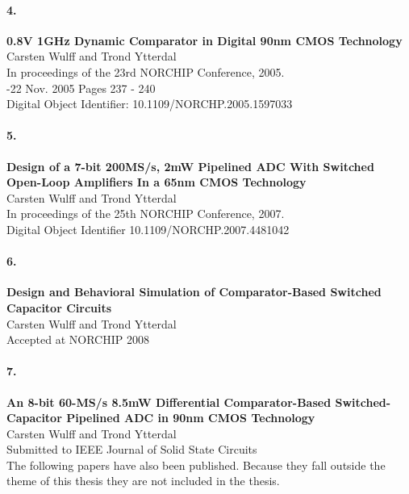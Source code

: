 \newpage
\paragraph{4.}\textbf{ 0.8V 1GHz Dynamic Comparator in Digital 90nm CMOS
  Technology}
\newline
\indent   Carsten Wulff and Trond Ytterdal\\
\indent In proceedings of the 23rd NORCHIP Conference, 2005. \\
-22 Nov. 2005 Pages 237 - 240 \\
\indent Digital Object Identifier: 10.1109/NORCHP.2005.1597033\\

\paragraph{5.}\textbf{Design of a 7-bit 200MS/s, 2mW Pipelined ADC With Switched
  Open-Loop Amplifiers In a 65nm CMOS Technology}\\
\indent Carsten Wulff and Trond Ytterdal\\
\indent In proceedings of the 25th NORCHIP Conference, 2007.\\
\indent  Digital Object Identifier 10.1109/NORCHP.2007.4481042 \\


\paragraph{6.}\textbf{Design and Behavioral Simulation of Comparator-Based Switched
  Capacitor Circuits}\\
\indent Carsten Wulff and Trond Ytterdal\\
\indent Accepted at NORCHIP 2008\\

\paragraph{7.}\textbf{An 8-bit 60-MS/s 8.5mW Differential Comparator-Based Switched-Capacitor
  Pipelined ADC in 90nm CMOS Technology}\\
\indent Carsten Wulff and Trond Ytterdal\\
\indent Submitted to IEEE Journal of Solid State Circuits\\

The following papers have also been published. Because they fall outside
the  theme of this thesis they are not included in the thesis.\\

